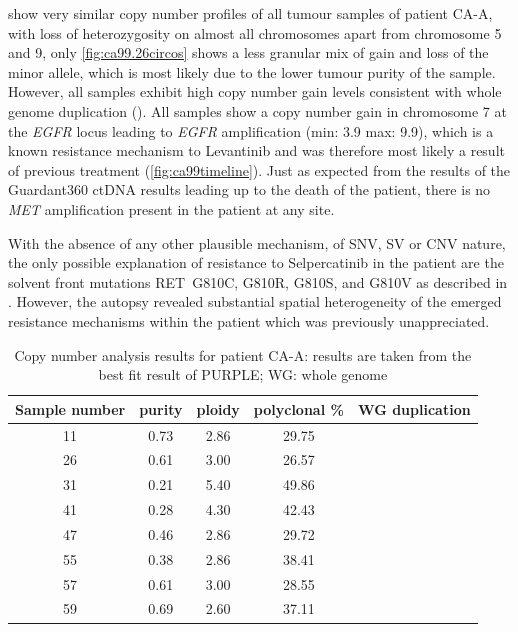  show very similar copy number profiles of all tumour samples of patient CA-A, with loss of heterozygosity on almost all chromosomes apart from chromosome 5 and 9, only \autoref{fig:ca99.26circos} shows a less granular mix of gain and loss of the minor allele, which is most likely due to the lower tumour purity of the sample. However, all samples exhibit high copy number gain levels consistent with whole genome duplication (). All samples show a copy number gain in chromosome 7 at the \textit{EGFR} locus leading to \textit{EGFR} amplification (min: 3.9 max: 9.9), which is a known resistance mechanism to Levantinib \cite{Jin2021} and was therefore most likely a result of previous treatment (\autoref{fig:ca99timeline}). Just as expected from the results of the Guardant360 ctDNA results leading up to the death of the patient, there is no \textit{MET} amplification present in the patient at any site.

With the absence of any other plausible mechanism, of SNV, SV or CNV nature, the only possible explanation of resistance to Selpercatinib in the patient are the solvent front mutations RET~G810C, G810R, G810S, and G810V as described in \textcite{Solomon2020}. However, the autopsy revealed substantial spatial heterogeneity of the emerged resistance mechanisms within the patient which was previously unappreciated.

\begin{table}[ht]
\caption[Copy number analysis results for patient CA-A]{Copy number analysis results for patient CA-A: results are taken from the best fit result of PURPLE; WG: whole genome}\label{tab:ca99cnv}
\centering
{}
\begin{tabular}{|c|c|c|c|c|}
\toprule
\hline
 \rowcolor{gray!50}
\textbf{Sample number} & \textbf{purity} & \textbf{ploidy} & \textbf{polyclonal \%} & \textbf{WG duplication}\\
\hline
 11 & \num{0.73} &	 \num{2.86} &	\num{29.75} & \cellcolor{white}	\\
 26 & \num{0.61} & \num{3.00} & \num{26.57} & \cellcolor{white} \\
 31 & \num{0.21} & \num{5.40} & \num{49.86} & \cellcolor{white} \\
 41 & \num{0.28} & \num{4.30} & \num{42.43} & \cellcolor{white} \\
 47 & \num{0.46} & \num{2.86} & \num{29.72} & \cellcolor{white} \\
 55 & \num{0.38} & \num{2.86} & \num{38.41} & \cellcolor{white} \\
 57 & \num{0.61} & \num{3.00} & \num{28.55} & \cellcolor{white} \\
 59 & \num{0.69} & \num{2.60} & \num{37.11} & \cellcolor{white}\multirow{-8}{*}{True} \\
 \hline
\bottomrule
\end{tabular}
\end{table} 


